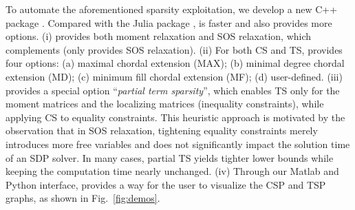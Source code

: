 To automate the aforementioned sparsity exploitation, we develop a new C++ package \spot. Compared with the Julia package \tssos, \spot is faster and also provides more options. (i) \spot provides both moment relaxation and SOS relaxation, which complements \tssos (only provides SOS relaxation). 
(ii) For both CS and TS, \spot provides four options: (a) maximal chordal extension (MAX); (b) minimal degree chordal extension (MD); (c) minimum fill chordal extension (MF); (d) user-defined. 
(iii) \spot provides a special option ``\emph{partial term sparsity}'', which enables TS only for the moment matrices and the localizing matrices (\ie inequality constraints), while applying CS to equality constraints. This heuristic approach is motivated by the observation that in SOS relaxation, tightening equality constraints merely introduces more free variables and does not significantly impact the solution time of an SDP solver. In many cases, partial TS yields tighter lower bounds while keeping the computation time nearly unchanged.
(iv) Through our Matlab and Python interface, \spot provides a way for the user to visualize the CSP and TSP graphs, as shown in Fig.~\ref{fig:demos}.







